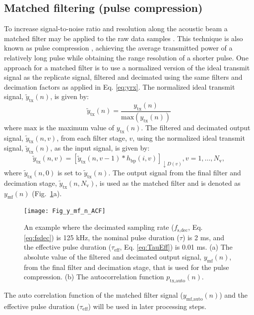 \documentclass[preprint,12pt,TurnOnLineNumbers]{JASAnew}
\newcommand{\samplesymt}{n}
\newcommand{\genidxsym}{i}
\newcommand{\stagesym}{v}
\newcommand{\nstages}{N_{\textrm{v}}}
\newcommand{\fsdec}{f_{\textrm{s,dec}}}
\newcommand{\tnom}{\tau}
\newcommand{\teff}{\tau_{\textrm{eff}}}
\newcommand{\ytx}{y_{\textrm{tx}}}
\newcommand{\ytxnorm}{\tilde{y}_{\textrm{tx}}}
\newcommand{\ymf}{y_{\textrm{mf}}}
\newcommand{\ymfauto}{y_{\textrm{mf,auto}}}
\newcommand{\ptxauto}{p_{\textrm{tx,auto}}}
\newcommand{\decfac}{D}
\newcommand{\hbp}{h_{\textrm{bp}}}
\begin{document}
\subsection{Matched filtering (pulse compression)}
To increase signal-to-noise ratio and resolution along the acoustic beam a matched filter may be applied to the raw data samples \citep{turin1960}. This technique is also known as pulse compression \citep{klauder1960}, achieving the average transmitted power of a relatively long pulse while obtaining the range resolution of a shorter pulse. One approach for a matched filter is to use a normalized version of the ideal transmit signal as the replicate signal, filtered and decimated using the same filters and decimation factors as applied in Eq. \ref{eq:yrx}. The normalized ideal transmit signal, $\ytxnorm(\samplesymt)$, is given by:
%
\begin{equation}
\label{eq:ytxnorm}
\ytxnorm(\samplesymt) = \frac{\ytx(\samplesymt)}{\textrm{max}(\ytx(\samplesymt))}\end{equation}
%
where $\textrm{max}$ is the maximum value of $\ytx(\samplesymt)$. The filtered and decimated output signal, $\ytxnorm(\samplesymt,\stagesym)$, from each filter stage, $\stagesym$, using the normalized ideal transmit signal, $\ytxnorm(\samplesymt)$, as the input signal, is given by:
%
\begin{equation}
\label{eq:FilterStagesTX}
\ytxnorm(\samplesymt,\stagesym) = \left[ \ytxnorm(\samplesymt,\stagesym-1) * \hbp(\genidxsym,\stagesym) \right]_{\downarrow \decfac(\stagesym)}, 
\stagesym = 1,\ldots,\nstages,
\end{equation}
%
where $\ytxnorm(\samplesymt,0)$ is set to $\ytxnorm(\samplesymt)$. The output signal from the final filter and decimation stage, $\ytxnorm(\samplesymt,\nstages)$, is used as the matched filter and is denoted as $\ymf(\samplesymt)$  (Fig.~\ref{fi:y_mf_n_ACF}a).
%
\begin{figure}
\texttt{[image: Fig\_y\_mf\_n\_ACF]}
\caption{\label{fi:y_mf_n_ACF} An example where the decimated sampling rate ($\fsdec$, Eq. \ref{eq:fsdec}) is 125 kHz, the nominal pulse duration ($\tnom$) is 2 ms, and the effective pulse duration ($\teff$, Eq. \ref{eq:TauEff}) is 0.01 ms. (a) The absolute value of the filtered and decimated output signal, $\ymf(\samplesymt)$, from the final filter and decimation stage, that is used for the pulse compression. (b) The autocorrelation function $\ptxauto(n)$.}
\end{figure}

The auto correlation function of the matched filter signal ($\ymfauto(\samplesymt)$) and the effective pulse duration ($\teff$) will be used in later processing steps.  
\end{document}
